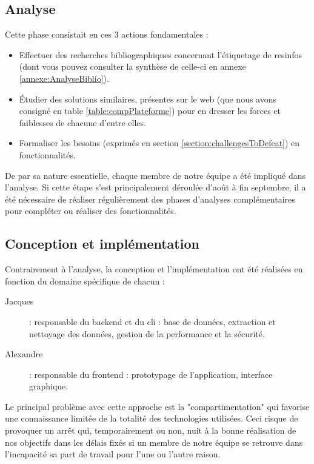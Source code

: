 \subsection*{Analyse}

Cette phase consistait en ces 3 actions fondamentales :
\begin{itemize}
    \item Effectuer des recherches bibliographiques concernant l'étiquetage de \glspl{resinfo} (dont vous pouvez consulter la synthèse de celle-ci en annexe \ref{annexe:AnalyseBiblio}).
    \item Étudier des solutions similaires, présentes sur le web (que nous avons consigné en table \ref{table:compPlateforme}) pour en dresser les forces et faiblesses de chacune d'entre elles.
    \item Formaliser les besoins (exprimés en section \ref{section:challengesToDefeat}) en fonctionnalités.
\end{itemize}

De par sa nature essentielle, chaque membre de notre équipe a été impliqué dans l'analyse. Si cette étape s'est principalement déroulée d'août à fin septembre, il a été nécessaire de réaliser régulièrement des phases d'analyses complémentaires pour compléter ou réaliser des fonctionnalités.

\subsection*{Conception et implémentation}

Contrairement à l'analyse, la conception et l'implémentation ont été réalisées en fonction du domaine spécifique de chacun : 

\begin{description}
    \item[Jacques] : responsable du \gls{backend} et du \Gls{cli} : base de données, extraction et nettoyage des données, gestion de la performance et la sécurité.
    \item[Alexandre] : responsable du \gls{frontend} : prototypage de l'application, interface graphique.
\end{description}

Le principal problème avec cette approche est la "compartimentation" qui favorise une connaissance limitée de la totalité des technologies utilisées. Ceci risque de provoquer un arrêt qui, temporairement ou non, nuit à la bonne réalisation de nos objectifs dans les délais fixés si un membre de notre équipe se retrouve dans l'incapacité sa part de travail pour l'une ou l'autre raison. \\

